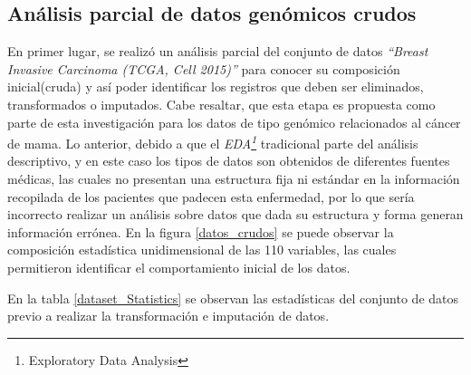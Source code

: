 \newpage
\subsection{Análisis parcial de datos genómicos crudos}
En primer lugar, se realizó un análisis parcial del conjunto de datos \textit{“Breast Invasive Carcinoma (TCGA, Cell 2015)”} para conocer su composición inicial(cruda) y así poder identificar los registros que deben ser eliminados, transformados o imputados. Cabe resaltar, que esta etapa es propuesta como parte de esta investigación para los datos de tipo genómico relacionados al cáncer de mama. Lo anterior, debido a que el \textit{EDA\footnote{Exploratory Data Analysis}} tradicional parte del análisis descriptivo, y en este caso los tipos de datos son obtenidos de diferentes fuentes médicas, las cuales no presentan una estructura fija ni estándar en la información recopilada de los pacientes que padecen esta enfermedad, por lo que sería incorrecto realizar un análisis sobre datos que dada su estructura y forma generan información errónea. En la figura \ref{datos_crudos} se puede observar la composición estadística unidimensional de las 110 variables, las cuales permitieron identificar el comportamiento inicial de los datos.

En la tabla \ref{dataset_Statistics} se observan las estadísticas del conjunto de datos previo a realizar la transformación e imputación de datos. 

